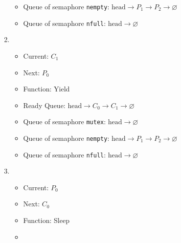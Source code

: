 \documentclass[11pt]{article}
\begin{document}
\begin{question}
\begin{enumerate}
{\begin{itemize}
                        \item{
                            Queue of semaphore {\tt nempty}: $\text{head}\longrightarrow
                            P_{1}\longrightarrow
                            P_{2}\longrightarrow
                            \varnothing$
                        }
                        \item{
                            Queue of semaphore {\tt nfull}: $\text{head}\longrightarrow
                            \varnothing$
                        }
                \end{itemize}
                }
                \item {
                    \begin{itemize}
                        \item{Current: $C_{1}$}
                        \item{Next: $P_{0}$}
                        \item{Function: Yield}
                        \item{
                            Ready Queue: $\text{head}\longrightarrow
                            C_{0}\longrightarrow
                            C_{1}\longrightarrow
                            \varnothing$
                        } \item{
                            Queue of semaphore {\tt mutex}: $\text{head}\longrightarrow
                            \varnothing$
                        }
                        \item{
                            Queue of semaphore {\tt nempty}: $\text{head}\longrightarrow
                            P_{1}\longrightarrow
                            P_{2}\longrightarrow
                            \varnothing$
                        }
                        \item{
                            Queue of semaphore {\tt nfull}: $\text{head}\longrightarrow
                            \varnothing$
                        }
                \end{itemize}
                }
                \item {
                    \begin{itemize}
                        \item{Current: $P_{0}$}
                        \item{Next: $C_{0}$}
                        \item{Function: Sleep}
                        \item{
}
\end{itemize}}
\end{enumerate}
\end{question}
\end{document}
